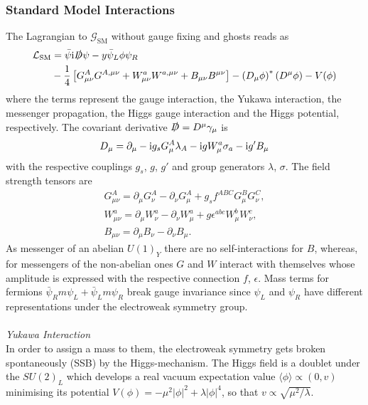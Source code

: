 \subsubsection{Standard Model Interactions}
The Lagrangian to $\mathcal{G}_\text{SM}$ without gauge fixing and ghosts reads as
\begin{align}
 \mathcal{L}_\text{SM} &= \bar \psi \text{i} \slashed{D}\psi -y\bar\psi_L\phi\psi_R \nonumber\\
 &- \frac14\left[G^A_{\mu\nu}G^{A,\mu\nu} + W^a_{\mu\nu}W^{a,\mu\nu} + B_{\mu\nu}B^{\mu\nu}\right] - \left(D_\mu\phi\right)^*\left(D^\mu\phi\right) - V(\phi)    
 \label{eq_smlagrange}
\end{align}
where the terms represent the gauge interaction, the Yukawa interaction, the messenger propagation, the Higgs gauge interaction and
the Higgs potential, respectively. The covariant derivative $\slashed{D}=D^\mu\gamma_\mu$ is
\begin{align}
 D_\mu = \partial_\mu -\text{i} g_s G^A_\mu \lambda_A - \text{i} g W^a_\mu\sigma_a - \text{i} g'B_\mu
\end{align}
with the respective couplings $g_s$, $g$, $g'$ and group generators $\lambda$, $\sigma$. The field strength tensors are
\begin{align}
 G^A_{\mu\nu} = \partial_\mu G^A_\nu - \partial_\nu G^A_\mu + g_s f^{ABC}G^B_\mu G^C_\nu,\\
 W^a_{\mu\nu} = \partial_\mu W^a_\nu - \partial_\nu W^a_\mu + g \epsilon^{abc}W^b_\mu W^c_\nu,\\
 B_{\mu\nu} = \partial_\mu B_\nu - \partial_\nu B_\mu.
\end{align}
As messenger of an abelian $U(1)_Y$ there are no self-interactions for $B$, whereas, for messengers of the non-abelian ones $G$ and $W$ interact 
with themselves whose amplitude is expressed with the respective connection $f$, $\epsilon$. Mass terms for fermions $\bar\psi_R m\psi_L + \bar\psi_L m\psi_R$ 
break gauge invariance since $\psi_L$ and $\psi_R$ have different representations under the electroweak symmetry group. 
\\ \\ \textit{Yukawa Interaction} \\
\noindent In order to assign a 
mass to them, the electroweak symmetry gets broken spontaneously (SSB) by the Higgs-mechanism. The Higgs field is a doublet under the $SU(2)_L$ which 
develops 
a real vacuum expectation value $\langle \phi\rangle \propto (0,v)$ minimising its potential $V(\phi)=-\mu^2|\phi|^2+\lambda|\phi|^4$, so that
$v\propto\sqrt{\mu^2/\lambda}$. 
